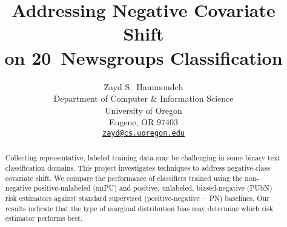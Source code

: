 \documentclass{article}
\title{Addressing Negative Covariate Shift \\ on 20~Newsgroups Classification}
\author{%
  Zayd S.\ Hammoudeh \\
  Department of Computer \& Information Science \\
  University of Oregon \\
  Eugene, OR 97403 \\
  \texttt{\href{mailto:zayd@cs.uoregon.edu}{zayd@cs.uoregon.edu}}
}
\begin{document}
\maketitle

\begin{abstract}
  Collecting representative, labeled training data may be challenging in some binary text classification domains. This project investigates techniques to address negative-class covariate shift.  We compare the performance of classifiers trained using the non-negative positive-unlabeled (nnPU) and positive, unlabeled, biased-negative (PUbN) risk estimators against standard supervised (positive-negative --~PN) baselines. Our results indicate that the type of marginal distribution bias may determine which risk estimator performs best.
\end{abstract}










\end{document}
